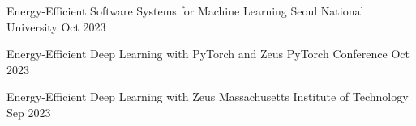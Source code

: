 

\begin{cvtalks}

%
  \cvtalk
    {Energy-Efficient Software Systems for Machine Learning} %
    {Seoul National University} %
    {Oct 2023} %

  \cvtalk
    {Energy-Efficient Deep Learning with PyTorch and Zeus} %
    {PyTorch Conference} %
    {Oct 2023} %

  \cvtalk
    {Energy-Efficient Deep Learning with Zeus} %
    {Massachusetts Institute of Technology} %
    {Sep 2023} %

\end{cvtalks}
